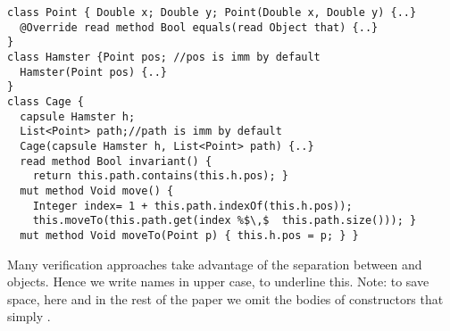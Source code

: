 

\begin{lstlisting}
class Point { Double x; Double y; Point(Double x, Double y) {..}
  @Override read method Bool equals(read Object that) {..} 
}
class Hamster {Point pos; //pos is imm by default
  Hamster(Point pos) {..} 
}
class Cage {
  capsule Hamster h;
  List<Point> path;//path is imm by default
  Cage(capsule Hamster h, List<Point> path) {..}
  read method Bool invariant() {
    return this.path.contains(this.h.pos); }
  mut method Void move() {
    Integer index= 1 + this.path.indexOf(this.h.pos));
    this.moveTo(this.path.get(index %$\,$  this.path.size())); }
  mut method Void moveTo(Point p) { this.h.pos = p; } }
\end{lstlisting}
Many verification approaches take advantage of the separation between  and objects.
 Hence we write  names in upper case, to underline this. Note: to save space, here and in the rest of the paper we omit the bodies of constructors that simply .

